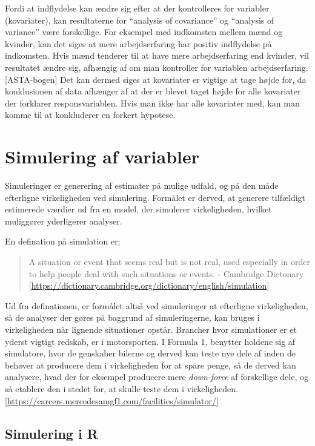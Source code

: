 \documentclass[]{book}
\theoremstyle{definition}
\theoremstyle{definition}
\theoremstyle{definition}
\theoremstyle{remark}
\begin{document}
Fordi at indflydelse kan ændre sig efter at der kontrolleres for variabler (kovariater), kan resultaterne for ``analysis of covariance'' og ``analysis of variance'' være forskellige. For eksempel med indkomsten mellem mænd og kvinder, kan det siges at mere arbejdserfaring har positiv indflydelse på indkomsten. Hvis mænd tenderer til at have mere arbejdserfaring end kvinder, vil resultatet ændre sig, afhængig af om man kontroller for variablen arbejdserfaring. {[}ASTA-bogen{]}
Det kan dermed siges at kovariater er vigtige at tage højde for, da konklusionen af data afhænger af at der er blevet taget højde for alle kovariater der forklarer responsvariablen. Hvis man ikke har alle kovariater med, kan man komme til at konkluderer en forkert hypotese.

\hypertarget{simulering-af-variabler}{%
\chapter{Simulering af variabler}\label{simulering-af-variabler}}

Simuleringer er generering af estimater på mulige udfald, og på den måde efterligne virkeligheden ved simulering. Formålet er derved, at generere tilfældigt estimerede værdier ud fra en model, der simulerer virkeligheden, hvilket muliggører yderligerer analyser.

En defination på simulation er;

\begin{quote}
A situation or event that seems real but is not real, used especially in order to help people deal with such situations or events. - Cambridge Dictonary {[}\url{https://dictionary.cambridge.org/dictionary/english/simulation}{]}
\end{quote}

Ud fra definationen, er formålet altså ved simuleringer at efterligne virkeligheden, så de analyser der gøres på baggrund af simuleringerne, kan bruges i virkeligheden når lignende situationer opstår.
Brancher hvor simulationer er et yderst vigtigt redskab, er i motorsporten. I Formula 1, benytter holdene sig af simulatore, hvor de genskaber bilerne og derved kan teste nye dele af inden de behøver at producere dem i virkeligheden for at spare penge, så de derved kan analysere, hvad der for eksempel producere mere \emph{down-force} af forskellige dele, og så etablere den i stedet for, at skulle teste dem i virkeligheden. {[}\url{https://careers.mercedesamgf1.com/facilities/simulator/}{]}

\hypertarget{simulering-i-r}{%
\section{Simulering i R}\label{simulering-i-r}}
\end{document}
